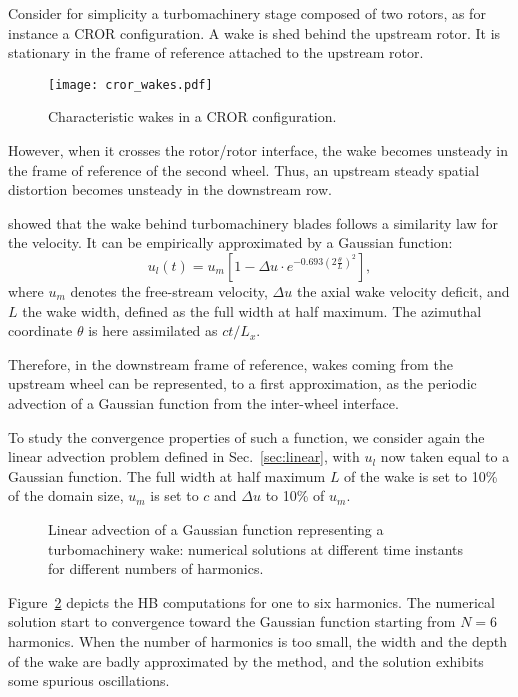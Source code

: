 
Consider for simplicity a turbomachinery stage composed of two rotors,
as for instance a CROR configuration.
A wake is shed behind the upstream rotor. 
It is stationary in the frame of reference attached to the upstream rotor.
\begin{figure}[htp]
    \centering\texttt{[image: cror\_wakes.pdf]}
  \caption{Characteristic wakes in a CROR configuration.}
  \label{fig:rotor-stator}
\end{figure}
However, when it crosses the rotor/rotor interface,
the wake becomes unsteady in the frame of reference of the second wheel. 
Thus, an upstream steady spatial distortion becomes unsteady in
the downstream row.

\citet{Lakshminarayana1980} showed that the wake
behind turbomachinery blades follows a similarity law for the velocity. 
It can be empirically approximated by a Gaussian function:
\begin{equation}
    u_l (t) = u_m \left[1 - 
        \Delta u \cdot e^{
          -0.693 \left(2 \frac{\theta}{L} \right) ^ 2}\right],
    \label{eq:similarity}
\end{equation}
where $u_m$ denotes the free-stream velocity, 
$\Delta u$ the axial wake velocity deficit,
and $L$ the wake width,
defined as the full width at half maximum.
The azimuthal coordinate $\theta$ is here assimilated as $c t / L_x$.

Therefore, in the downstream frame of reference, wakes coming 
from the upstream wheel can be represented, 
to a first approximation, as the periodic 
advection of a Gaussian function from the inter-wheel interface.

To study the convergence properties of such a function,
we consider again the linear advection problem defined in Sec.~\ref{sec:linear}, 
with $u_l$ now taken equal to a Gaussian function.
The full width at half maximum $L$ of the wake is set to 10\% of the domain size, 
$u_m$ is set to $c$ and $\Delta u$ to 10\% of $u_m$.

\begin{figure}[htp]
  \centering
  \caption{Linear advection of a Gaussian function representing a turbomachinery wake: 
  numerical solutions at different time instants for different numbers of harmonics.}
  \label{fig:inj_wake_results}
\end{figure}
Figure~\ref{fig:inj_wake_results} depicts the HB
computations for one to six harmonics. The numerical solution start to convergence
toward the Gaussian function starting from $N=6$ harmonics.
When the number of harmonics is
too small, the width and the depth of the wake are badly approximated
by the method, and the solution exhibits some spurious oscillations. 

